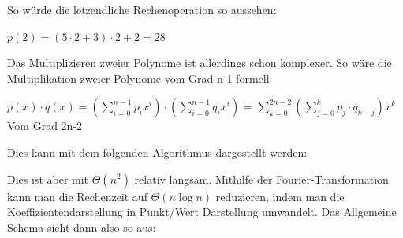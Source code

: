 \documentclass[
../../AuD-Zusammenfassung.tex,
]
{subfiles}
\begin{document}
So würde die letzendliche Rechenoperation so aussehen:
\begin{center}
    $p(2) = (5 \cdot 2 + 3) \cdot 2 + 2 = 28$ 
\end{center}
\newpage
Das Multiplizieren zweier Polynome ist allerdings schon komplexer. So wäre die Multiplikation zweier Polynome vom Grad n-1 formell: 
\begin{center}
    $p(x) \cdot q(x) = (\sum_{i=0}^{n-1}p_ix^i) \cdot (\sum_{i=0}^{n-1}q_ix^i)$ = $\sum_{k=0}^{2n-2}(\sum_{j=0}^{k}p_j\cdot q_{k-j})x^k$\\
    Vom Grad 2n-2
\end{center}
Dies kann mit dem folgenden Algorithmus dargestellt werden:\\
\begin{algorithm}[H]
\end{algorithm}
Dies ist aber mit $\Theta(n^2)$ relativ langsam. Mithilfe der Fourier-Transformation kann man die Rechenzeit auf $\Theta(n \log n)$ reduzieren, indem man die Koeffizientendarstellung in Punkt/Wert Darstellung umwandelt. 
Das Allgemeine Schema sieht dann also so aus:\\
\end{document}
